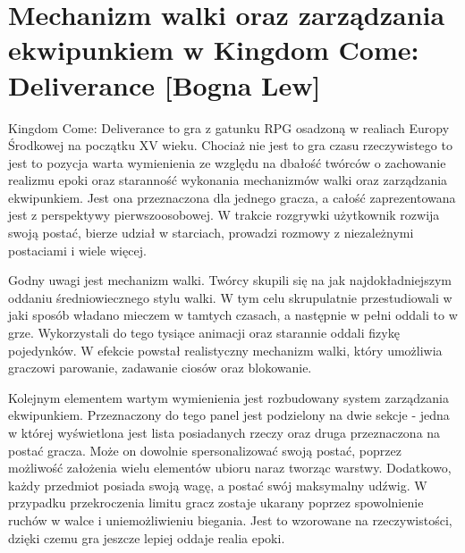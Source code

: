 \section{Mechanizm walki oraz zarządzania ekwipunkiem w Kingdom Come: Deliverance [Bogna Lew]}

Kingdom Come: Deliverance to gra z gatunku RPG osadzoną w realiach Europy Środkowej na początku XV wieku. Chociaż nie
jest to gra czasu rzeczywistego to jest to pozycja warta wymienienia ze względu na dbałość twórców o zachowanie realizmu
epoki oraz staranność wykonania mechanizmów walki oraz zarządzania ekwipunkiem. Jest ona przeznaczona dla jednego gracza,
a całość zaprezentowana jest z perspektywy pierwszoosobowej. W trakcie rozgrywki użytkownik rozwija swoją postać, bierze
udział w starciach, prowadzi rozmowy z niezależnymi postaciami i wiele więcej.

Godny uwagi jest mechanizm walki. Twórcy skupili się na jak najdokładniejszym oddaniu średniowiecznego stylu walki. W tym
celu skrupulatnie przestudiowali w jaki sposób władano mieczem w tamtych czasach, a następnie w pełni oddali to w grze.
Wykorzystali do tego tysiące animacji oraz starannie oddali fizykę pojedynków. W efekcie powstał realistyczny mechanizm
walki, który umożliwia graczowi parowanie, zadawanie ciosów oraz blokowanie.

Kolejnym elementem wartym wymienienia jest rozbudowany system zarządzania ekwipunkiem. Przeznaczony do tego panel jest
podzielony na dwie sekcje - jedna w której wyświetlona jest lista posiadanych rzeczy oraz druga przeznaczona na postać
gracza. Może on dowolnie spersonalizować swoją postać, poprzez możliwość założenia wielu elementów ubioru naraz tworząc
warstwy.  Dodatkowo, każdy przedmiot posiada swoją wagę, a postać swój maksymalny udźwig. W przypadku przekroczenia limitu
gracz zostaje ukarany poprzez spowolnienie ruchów w walce i uniemożliwieniu biegania. Jest to wzorowane na rzeczywistości,
dzięki czemu gra jeszcze lepiej oddaje realia epoki.
